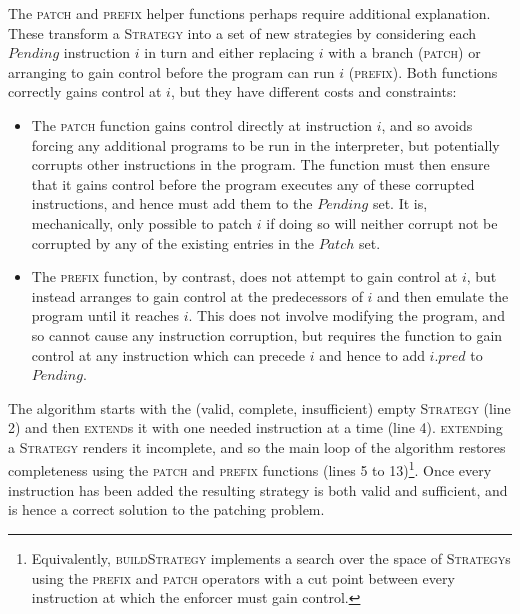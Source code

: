 The \textsc{patch} and \textsc{prefix} helper functions perhaps
require additional explanation.  These transform a
\textsc{Strategy} into a set of new strategies by considering
each $\mathit{Pending}$ instruction $i$ in turn and either replacing
$i$ with a branch (\textsc{patch}) or arranging to gain control before
the program can run $i$ (\textsc{prefix}).  Both functions correctly
gains control at $i$, but they have different costs and constraints:
\begin{itemize}
\item The \textsc{patch} function gains control directly at
  instruction $i$, and so avoids forcing any additional programs to be
  run in the interpreter, but potentially corrupts other instructions
  in the program.  The function must then ensure that it gains control
  before the program executes any of these corrupted instructions, and
  hence must add them to the $\mathit{Pending}$ set.  It is,
  mechanically, only possible to patch $i$ if doing so will neither
  corrupt not be corrupted by any of the existing entries in the
  $\mathit{Patch}$ set.
\item The \textsc{prefix} function, by contrast, does not attempt to
  gain control at $i$, but instead arranges to gain control at the
  predecessors of $i$ and then emulate the program until it reaches
  $i$.  This does not involve modifying the program, and so cannot
  cause any instruction corruption, but requires the function to gain
  control at any instruction which can precede $i$ and hence to add
  $i.\mathit{pred}$ to $\mathit{Pending}$.
\end{itemize}
The algorithm starts with the (valid, complete, insufficient) empty
\textsc{Strategy} (line 2) and then \textsc{extend}s it with one
needed instruction at a time (line 4).  \textsc{extend}ing a
\textsc{Strategy} renders it incomplete, and so the main loop of
the algorithm restores completeness using the \textsc{patch} and
\textsc{prefix} functions (lines 5 to 13)\footnote{Equivalently,
  \textsc{buildStrategy} implements a search over the space of
  \textsc{Strategy}s using the \textsc{prefix} and \textsc{patch}
  operators with a cut point between every instruction at which the
  enforcer must gain control.}.  Once every instruction has been added
the resulting strategy is both valid and sufficient, and is hence a
correct solution to the patching problem.
